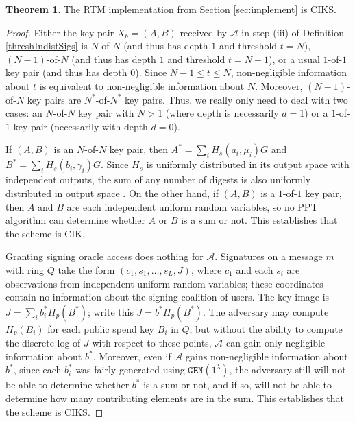 \documentclass[12pt,english,oneside]{mrl}
\theoremstyle{definition}
\newtheorem{thm}[lem]{Theorem}
\numberwithin{equation}{section}
\numberwithin{figure}{section}
\numberwithin{equation}{section}
\numberwithin{equation}{section}
\numberwithin{figure}{section}
\begin{document}
 \begin{thm}The RTM implementation from Section \ref{sec:implement} is CIKS.
 \end{thm}
 \begin{proof}
Either the key pair $X_b = (A,B)$ received by $\mathcal{A}$ in step (iii) of Definition \ref{threshIndistSigs} is $N$-of-$N$ (and thus has depth $1$ and threshold $t=N$), $(N-1)$-of-$N$ (and thus has depth $1$ and threshold $t=N-1$), or a usual $1$-of-$1$ key pair (and thus has depth $0$). Since $N-1 \leq t \leq N$, non-negligible information about $t$ is equivalent to non-negligible information about $N$. Moreover, $(N-1)$-of-$N$ key pairs are $N^*$-of-$N^*$ key pairs. Thus, we really only need to deal with two cases: an $N$-of-$N$ key pair with $N > 1$ (where depth is necessarily $d=1$) or a $1$-of-$1$ key pair (necessarily with depth $d=0$).
  
  
 
  If $(A,B)$ is an $N$-of-$N$ key pair, then $A^* = \sum_{i} H_s(a_i, \mu_i) G$ and $B^* = \sum_i H_s(b_i, \gamma_i) G$. Since $H_s$ is uniformly distributed in its output space with independent outputs, the sum of any number of digests is also uniformly distributed in output space \cite{scozzafava1993uniform}. On the other hand, if $(A,B)$ is a $1$-of-$1$ key pair, then $A$ and $B$ are each independent uniform random variables, so no PPT algorithm can determine whether $A$ or $B$ is a sum or not. This establishes that the scheme is CIK.
  
  Granting signing oracle access does nothing for $\mathcal{A}$. Signatures on a message $m$ with ring $Q$ take the form $(c_1, s_1, \ldots, s_L, J)$, where $c_1$ and each $s_i$ are observations from independent uniform random variables; these coordinates contain no information about the signing coalition of users.  The key image is $J = \sum_i b^*_i H_p(B^*)$; write this $J = b^* H_p(B^*)$. The adversary may compute $H_p(B_i)$ for each public spend key $B_i$ in $Q$, but without the ability to compute the discrete log of $J$ with respect to these points, $\mathcal{A}$ can gain only negligible information about $b^*$. Moreover, even if $\mathcal{A}$ gains non-negligible information about $b^*$, since each $b^*_i$ was fairly generated using $\texttt{GEN}(1^{\lambda})$, the adversary still will not be able to determine whether $b^*$ is a sum or not, and if so, will not be able to determine how many contributing elements are in the sum. This establishes that the scheme is CIKS.
  
  
  
  \end{proof}
 
\end{document}
